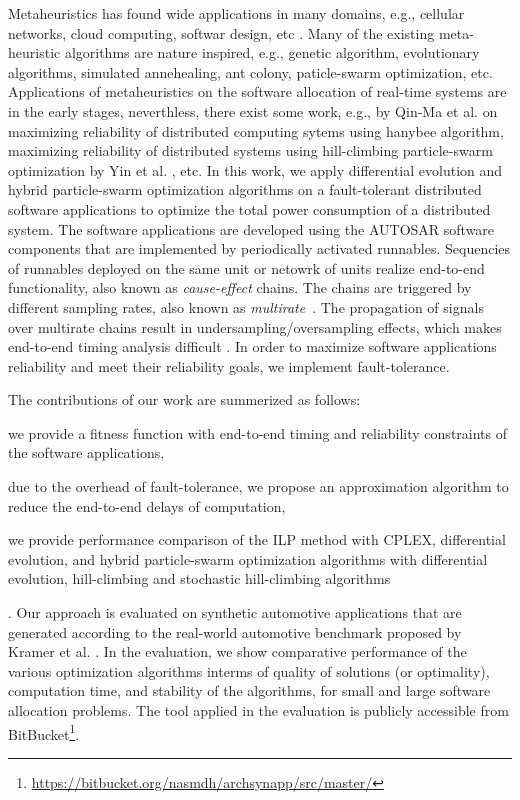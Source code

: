 Metaheuristics has found wide applications in many domains, e.g.,  cellular networks, cloud computing, softwar design, etc \cite{bibid}. Many of the existing meta-heuristic algorithms are nature inspired, e.g., genetic algorithm, evolutionary algorithms, simulated annehealing, ant colony, paticle-swarm optimization, etc. Applications of metaheuristics on the software allocation of real-time systems are in the early stages, neverthless, there exist some work, e.g., by Qin-Ma et al. \cite{bibid} on maximizing reliability of distributed computing sytems using hanybee algorithm, maximizing reliability of distributed systems using hill-climbing particle-swarm optimization by Yin et al. \cite{yin2007task}, etc. In this work, we apply differential evolution and hybrid particle-swarm optimization algorithms on a fault-tolerant distributed software applications to optimize the total power consumption of a distributed system. The software applications are developed using the AUTOSAR software components that are implemented by periodically activated runnables. Sequencies of runnables deployed on the same unit or netowrk of units realize end-to-end functionality, also known as \textit{cause-effect} chains. The chains are triggered by different sampling rates, also known as  \textit{multirate}~\cite{Vinet2010APolynomials}. The propagation of signals over multirate chains result in undersampling/oversampling effects, which makes end-to-end timing analysis difficult \cite{mubeen2013support}. In order to maximize software applications reliability and meet their reliability goals, we implement fault-tolerance. %

The contributions of our work are summerized as follows: 
\begin{enumerate*}[label=(\roman*)]
	\item we provide a fitness function with end-to-end timing and reliability constraints of the software applications,
	\item due to the overhead of fault-tolerance, we propose an approximation algorithm to reduce the end-to-end delays of computation,
	\item we provide performance comparison of the ILP method with CPLEX, differential evolution, and hybrid particle-swarm optimization algorithms with differential evolution, hill-climbing and stochastic hill-climbing algorithms
\end{enumerate*}. Our approach is evaluated on synthetic automotive applications that are generated according to the real-world automotive benchmark proposed by Kramer et al. \cite{Kramer2015RealFree}. In the evaluation, we show comparative performance of the various optimization algorithms interms of quality of solutions (or optimality), computation time,  and stability of the algorithms, for small and large software allocation problems. The tool applied in the evaluation is publicly accessible from BitBucket\footnote{\url{https://bitbucket.org/nasmdh/archsynapp/src/master/}}. 

